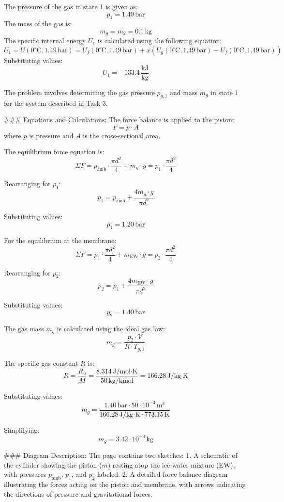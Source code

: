 The pressure of the gas in state 1 is given as:  
\[
p_1 = 1.49 \, \text{bar}
\]  
The mass of the gas is:  
\[
m_g = m_2 = 0.1 \, \text{kg}
\]  
The specific internal energy \( U_1 \) is calculated using the following equation:  
\[
U_1 = U(0^\circ\text{C}, 1.49 \, \text{bar}) = U_f(0^\circ\text{C}, 1.49 \, \text{bar}) + x(U_g(0^\circ\text{C}, 1.49 \, \text{bar}) - U_f(0^\circ\text{C}, 1.49 \, \text{bar}))
\]  
Substituting values:  
\[
U_1 = -133.4 \, \frac{\text{kJ}}{\text{kg}}
\]

The problem involves determining the gas pressure \( p_{g,1} \) and mass \( m_g \) in state 1 for the system described in Task 3.  

### Equations and Calculations:  
The force balance is applied to the piston:  
\[
F = p \cdot A
\]  
where \( p \) is pressure and \( A \) is the cross-sectional area.  

The equilibrium force equation is:  
\[
\Sigma F = p_{\text{amb}} \cdot \frac{\pi d^2}{4} + m_g \cdot g = p_1 \cdot \frac{\pi d^2}{4}
\]  

Rearranging for \( p_1 \):  
\[
p_1 = p_{\text{amb}} + \frac{4 m_g \cdot g}{\pi d^2}
\]  

Substituting values:  
\[
p_1 = 1.20 \, \text{bar}
\]  

For the equilibrium at the membrane:  
\[
\Sigma F = p_1 \cdot \frac{\pi d^2}{4} + m_{\text{EW}} \cdot g = p_2 \cdot \frac{\pi d^2}{4}
\]  

Rearranging for \( p_2 \):  
\[
p_2 = p_1 + \frac{4 m_{\text{EW}} \cdot g}{\pi d^2}
\]  

Substituting values:  
\[
p_2 = 1.40 \, \text{bar}
\]  

The gas mass \( m_g \) is calculated using the ideal gas law:  
\[
m_g = \frac{p_2 \cdot V}{R \cdot T_{g,1}}
\]  

The specific gas constant \( R \) is:  
\[
R = \frac{R_u}{M} = \frac{8.314 \, \text{J/mol·K}}{50 \, \text{kg/kmol}} = 166.28 \, \text{J/kg·K}
\]  

Substituting values:  
\[
m_g = \frac{1.40 \, \text{bar} \cdot 50 \cdot 10^{-3} \, \text{m}^3}{166.28 \, \text{J/kg·K} \cdot 773.15 \, \text{K}}
\]  

Simplifying:  
\[
m_g = 3.42 \cdot 10^{-3} \, \text{kg}
\]  

### Diagram Description:  
The page contains two sketches:  
1. A schematic of the cylinder showing the piston (\( m \)) resting atop the ice-water mixture (EW), with pressures \( p_{\text{amb}} \), \( p_1 \), and \( p_2 \) labeled.  
2. A detailed force balance diagram illustrating the forces acting on the piston and membrane, with arrows indicating the directions of pressure and gravitational forces.
